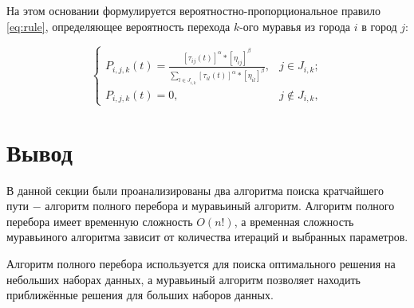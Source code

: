 На этом основании формулируется вероятностно-пропорциональное правило \ref{eq:rule}, определяющее вероятность перехода $k$-ого муравья из города $i$ в город $j$:

\begin{equation}
	\label{eq:rule}
	\begin{cases}
	P_{i,j,k}(t) = \frac{[\tau_{ij}(t)]^\alpha*[\eta_{ij}]^\beta}{\sum_{l\in J_{i,k}}^{}[\tau_{il}(t)]^\alpha * [\eta_{il}]^\beta}, & j \in J_{i,k};\\
	P_{i,j,k}(t) = 0, & j \notin J_{i,k},
	\end{cases}
\end{equation}

\section*{Вывод}

В данной секции были проанализированы два алгоритма поиска кратчайшего пути $-$ алгоритм полного перебора и муравьиный алгоритм. 
Алгоритм полного перебора имеет временную сложность $O(n!)$, а временная сложность муравьиного алгоритма зависит от количества итераций и выбранных параметров.

Алгоритм полного перебора используется для поиска оптимального решения на небольших наборах данных, а муравьиный алгоритм позволяет находить приближённые решения для больших наборов данных.
\clearpage
